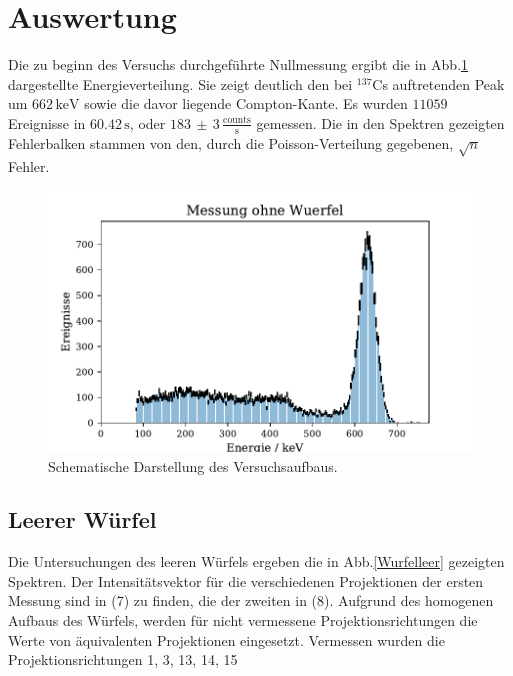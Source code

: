 \section{Auswertung}
Die zu beginn des Versuchs durchgeführte Nullmessung ergibt die in Abb.\ref{Leermessung} dargestellte Energieverteilung. Sie zeigt deutlich den bei $^{137}$Cs auftretenden Peak um $662 \, \si{\kilo\electronvolt}$ sowie die davor liegende
Compton-Kante. Es wurden $11059$ Ereignisse in $60.42 \, \si{\second}$, oder $183 \,  \pm \, 3\, \frac{\text{counts}}{\si{\second}}$ gemessen.
Die in den Spektren gezeigten Fehlerbalken stammen von den, durch die Poisson-Verteilung gegebenen, $\sqrt{n}$ Fehler.
\begin{figure}[H]
  \centering
  \includegraphics{plots/leer.pdf}
  \caption{Schematische Darstellung des Versuchsaufbaus.\cite{anleitung}}
  \label{Leermessung}
\end{figure}
\subsection{Leerer Würfel}
Die Untersuchungen des leeren Würfels ergeben die in Abb.\ref{Wurfelleer} gezeigten Spektren. Der Intensitätsvektor
für die verschiedenen Projektionen der ersten Messung sind in (7) zu finden, die der zweiten in (8).
Aufgrund des homogenen Aufbaus des Würfels,
werden für nicht vermessene Projektionsrichtungen die Werte von äquivalenten Projektionen eingesetzt.
Vermessen wurden die Projektionsrichtungen 1, 3, 13, 14, 15

